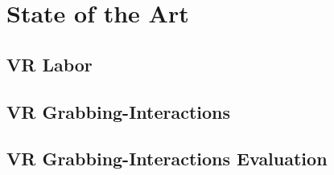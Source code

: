 \section{State of the Art} \label{sec:StateOfTheArt}


\subsection{VR Labor}\label{sec:SOTALabor}

\subsection{VR Grabbing-Interactions}\label{sec:SOTAInteractions}

\subsection{VR Grabbing-Interactions Evaluation}\label{sec:SOTAInteractionEvalutiom}

\newpage
